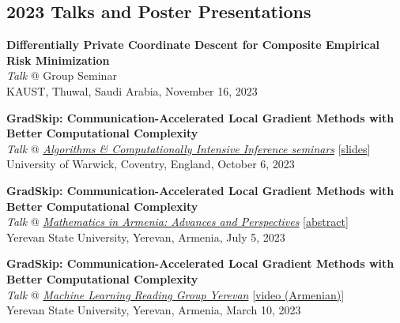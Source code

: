 \documentclass[11pt,a4paper,sans]{moderncv}        %
\begin{document}
\subsection{2023 Talks and Poster Presentations}
\begin{etaremune}[resume]
\item \textbf{Differentially Private Coordinate Descent for Composite Empirical Risk Minimization}\\
\textit{Talk} @ Group Seminar \\
KAUST, Thuwal, Saudi Arabia, November 16, 2023

\item \textbf{GradSkip: Communication-Accelerated Local Gradient Methods with Better Computational Complexity}\\
\textit{Talk} @ \textcolor{accent}{\href{https://warwick.ac.uk/fac/sci/statistics/news/algorithms-seminars/\#:\textasciitilde:text=06/10-,Artavazd\%20Maranjyan,-Link\%20opens\%20in}{\textit{Algorithms \& Computationally Intensive Inference seminars}}} [\href{https://warwick.ac.uk/fac/sci/statistics/news/algorithms-seminars/slides_2023_10_06_arto_maranjyan_gradskip.pdf}{slides}]\\
University of Warwick, Coventry, England, October 6, 2023

\item \textbf{GradSkip: Communication-Accelerated Local Gradient Methods with Better Computational Complexity}\\
\textit{Talk} @ \textcolor{accent}{\href{http://mathconf.sci.am/index.html}{\textit{Mathematics in Armenia: Advances and Perspectives}}} [\href{http://mathconf.sci.am/MiA2023AbstractsBook.pdf#page=60}{abstract}]\\
Yerevan State University, Yerevan, Armenia, July 5, 2023

\item \textbf{GradSkip: Communication-Accelerated Local Gradient Methods with Better Computational Complexity}\\
\textit{Talk} @ \textcolor{accent}{\href{https://groups.google.com/g/ml-reading-group-yerevan/c/F_1OGqeFImY/m/BGDIqZAWBQAJ}{\textit{Machine Learning Reading Group Yerevan}}} [\textcolor{orange}{\href{https://www.youtube.com/watch?v=w9iHPgE82oo}{video (Armenian)}}]\\
Yerevan State University, Yerevan, Armenia, March 10, 2023
\end{etaremune}
\end{document}
